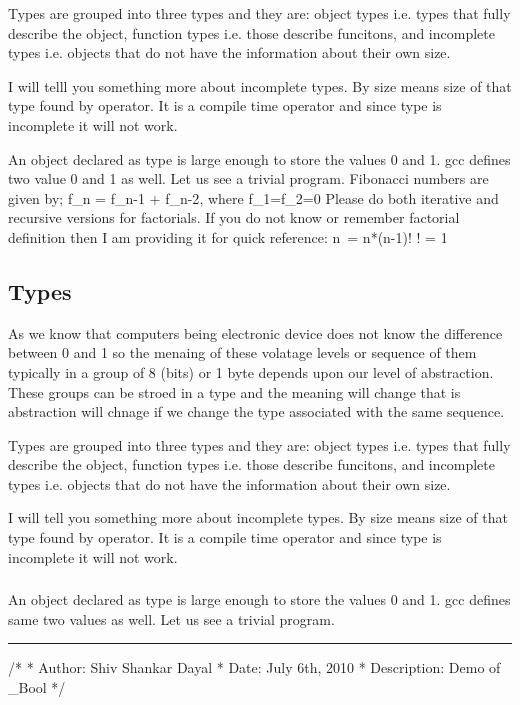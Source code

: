 Types are grouped into three types and they are: object types
i.e. types that fully describe the object, function types i.e. those
describe funcitons, and incomplete types i.e. objects that do not have
the information about their own size.

I will telll you something more about incomplete types. By size means
size of that type found by  operator. It is a compile
time operator and since type is incomplete it will not work.

An object declared as type  is large enough to store the
values 0 and 1. gcc defines two value 0 and 1 as well. Let us see a
trivial program.
Fibonacci numbers are given by;
\startformula
f_n = f_{n-1} + f_{n-2}, where f_1=f_2=0
\stopformula
Please do both iterative and recursive versions for factorials. If you
do not know or remember factorial definition then I am providing it
for quick reference:
\startformula
n\ = n*(n-1)!\hfill\break
\stopformula
{}
! = 1
\stopformula

\subsection{Types}
As we know that computers being electronic device does not know the
difference between 0 and 1 so the menaing of these volatage levels or
sequence of them typically in a group of 8 (bits) or 1 byte depends
upon our level of abstraction. These groups can be stroed in a type
and the meaning will change that is abstraction will chnage if we
change the type associated with the same sequence.

Types are grouped into three types and they are: object types
i.e. types that fully describe the object, function types i.e. those
describe funcitons, and incomplete types i.e. objects that do not have
the information about their own size.

I will tell you something more about incomplete types. By size means
size of that type found by  operator. It is a compile
time operator and since type is incomplete it will not work.

\subsubsection{}
An object declared as type  is large enough to store the
values 0 and 1. gcc defines same two values as well. Let us see a
trivial program.
\blank[force,1mm]\hrule\blank[force,1mm]
\startCPP
/*
 * Author: Shiv Shankar Dayal
 * Date: July 6th, 2010
 * Description: Demo of _Bool
 */

